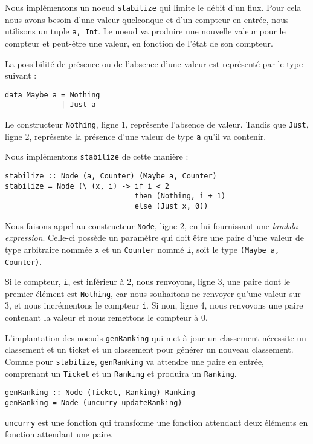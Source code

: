 \documentclass{llncs}
\begin{document}
Nous implémentons un noeud \lstinline{stabilize} qui limite le débit d'un flux.
Pour cela nous avons besoin d'une valeur quelconque et d'un compteur en entrée,
nous utilisons un tuple \lstinline{a, Int}.
Le noeud va produire une nouvelle valeur pour le compteur et peut-être une valeur,
en fonction de l'état de son compteur.

La possibilité de présence ou de l'absence d'une valeur est représenté par le type
suivant :

\begin{lstlisting}
data Maybe a = Nothing
             | Just a
\end{lstlisting}

Le constructeur \lstinline{Nothing}, ligne 1, représente l'absence de valeur.
Tandis que \lstinline{Just}, ligne 2, représente la présence d'une valeur de type
\lstinline{a} qu'il va contenir.

Nous implémentons \lstinline{stabilize} de cette manière :
\begin{lstlisting}
stabilize :: Node (a, Counter) (Maybe a, Counter)
stabilize = Node (\ (x, i) -> if i < 2
                              then (Nothing, i + 1)
                              else (Just x, 0))
\end{lstlisting}

Nous faisons appel au constructeur \lstinline{Node}, ligne 2, en lui fournissant
une \emph{lambda expression}.
Celle-ci possède un paramètre qui doit être une paire d'une valeur de type arbitraire
nommée \lstinline{x} et un \lstinline{Counter} nommé \lstinline{i}, soit le type
\lstinline{(Maybe a, Counter)}.

Si le compteur, \lstinline{i}, est inférieur à 2, nous renvoyons, ligne 3,
une paire dont le premier élément est \lstinline{Nothing}, car nous souhaitons
ne renvoyer qu'une valeur sur 3, et nous incrémentons le compteur \lstinline{i}.
Si non, ligne 4, nous renvoyons une paire contenant la valeur et nous remettons
le compteur à 0.

L'implantation des noeuds \lstinline{genRanking} qui met à jour un classement
nécessite un classement et un ticket et un classement pour générer un nouveau classement.
Comme pour \lstinline{stabilize}, \lstinline{genRanking} va attendre une paire en
entrée, comprenant un \lstinline{Ticket} et un \lstinline{Ranking} et produira
un \lstinline{Ranking}.
\begin{lstlisting}
genRanking :: Node (Ticket, Ranking) Ranking
genRanking = Node (uncurry updateRanking)
\end{lstlisting}
\lstinline{uncurry} est une fonction qui transforme une fonction attendant deux éléments
en fonction attendant une paire.
\end{document}
